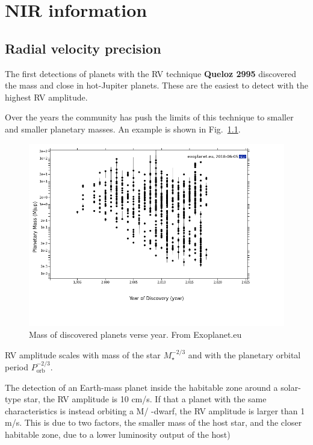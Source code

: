 
\chapter{NIR information}  %

\label{cha:nir_content}


\section{Radial velocity precision}
The first detections of planets with the RV technique \textbf{Queloz 2995} discovered the mass and close in hot-Jupiter planets. These are the easiest to detect with the highest RV amplitude.

Over the years the community has push the limits of this technique to smaller and smaller planetary masses. An example is shown in Fig.~\ref{fig:year_mass}. 
\begin{figure}

\includegraphics[width=0.8\linewidth]{figures/year_planet_mass.png}
\caption{Mass of discovered planets verse year. From Exoplanet.eu}
\label{fig:year_mass}
\end{figure}


RV amplitude scales with mass of the star $M_\star^{-2/3}$ and with the planetary orbital period $P_\textrm{orb}^{-2/3}$.

The detection of an Earth-mass planet inside the habitable zone around a solar-type star, the RV amplitude is 10 cm/s. If that a planet with the same characteristics is instead orbiting a M/ -dwarf, the RV amplitude is larger than 1 m/s. This is due to two factors, the smaller mass of the host star, and the closer habitable zone, due to a lower luminosity output of the host)

